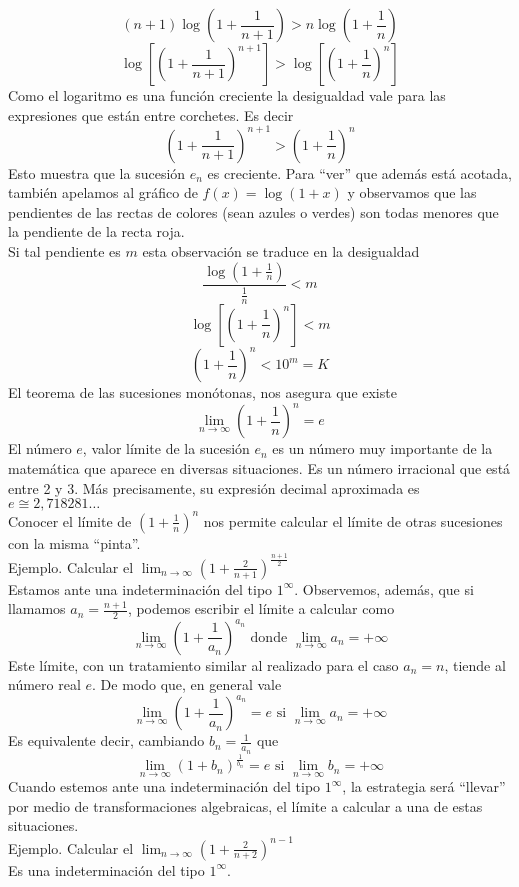 \documentclass[../Teoría.root.tex]{subfiles}
\begin{document}
\[(n+1)\log\left(1+\frac{1}{n+1}\right)>n\log\left(1+\frac{1}{n}\right)\]
\[\log\left[\left(1+\frac{1}{n+1}\right)^{n+1}\right]>\log\left[\left(1+\frac{1}{n}\right)^n\right]\]
Como el logaritmo es una función creciente la desigualdad vale para las expresiones que están entre corchetes.
Es decir \[\left(1+\frac{1}{n+1}\right)^{n+1}>\left(1+\frac{1}{n}\right)^n\]
Esto muestra que la sucesión \(e_n\) es creciente.
Para “ver” que además está acotada, también apelamos al gráfico de \(f(x)=\log(1+x)\) y observamos que las pendientes de las rectas de colores (sean azules o verdes) son todas menores que la pendiente de la recta roja.\\
Si tal pendiente es \(m\) esta observación se traduce en la desigualdad
\[\frac{\log\left(1+\frac{1}{n}\right)}{\frac{1}{n}}<m\]
\[\log\left[\left(1+\frac{1}{n}\right)^n\right]<m\]
\[\left(1+\frac{1}{n}\right)^n<10^m=K\]
El teorema de las sucesiones monótonas, nos asegura que existe \[\lim_{n\to\infty}\left(1+\frac{1}{n}\right)^n=e\]
El número \(e\), valor límite de la sucesión \(e_n\) es un número muy importante de la matemática que aparece en diversas situaciones.
Es un número irracional que está entre 2 y 3.
Más precisamente, su expresión decimal aproximada es \(e\cong2,718281\dots\)\\
Conocer el límite de \(\left(1+\frac{1}{n}\right)^n\) nos permite calcular el límite de otras sucesiones con la misma “pinta”.\\
Ejemplo. Calcular el \(\lim_{n\to\infty}\left(1+\frac{2}{n+1}\right)^{\frac{n+1}{2}}\)\\
Estamos ante una indeterminación del tipo \(1^\infty\).
Observemos, además, que si llamamos \(a_n=\frac{n+1}{2}\), podemos escribir el límite a calcular como
\[\lim_{n\to\infty}\left(1+\frac{1}{a_n}\right)^{a_n}\text{ donde }\lim_{n\to\infty}a_n=+\infty\]
Este límite, con un tratamiento similar al realizado para el caso \(a_n=n\), tiende al número real \(e\).
De modo que, en general vale
\[\lim_{n\to\infty}\left(1+\frac{1}{a_n}\right)^{a_n}=e\text{ si }\lim_{n\to\infty}a_n=+\infty\]
Es equivalente decir, cambiando \(b_n=\frac{1}{a_n}\) que
\[\lim_{n\to\infty}\left(1+b_n\right)^{\frac{1}{b_n}}=e\text{ si }\lim_{n\to\infty}b_n=+\infty\]
Cuando estemos ante una indeterminación del tipo \(1^\infty\), la estrategia será “llevar” por medio de transformaciones algebraicas, el límite a calcular a una de estas situaciones.\\
Ejemplo. Calcular el \(\lim_{n\to\infty}\left(1+\frac{2}{n+2}\right)^{n-1}\)\\
Es una indeterminación del tipo \(1^\infty\).
\end{document}
